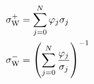 \begin{equation}
\begin{split}
\sigma_{\rm W}^{+} &= \sum_{j=0}^N \varphi_j \sigma_j \\
\sigma_{\rm W}^{-} &= \left(\sum_{j=0}^N \frac{\varphi_j}{\sigma_j}\right)^{-1}
\end{split}
\label{eq:wiener_bounds}
\end{equation}
